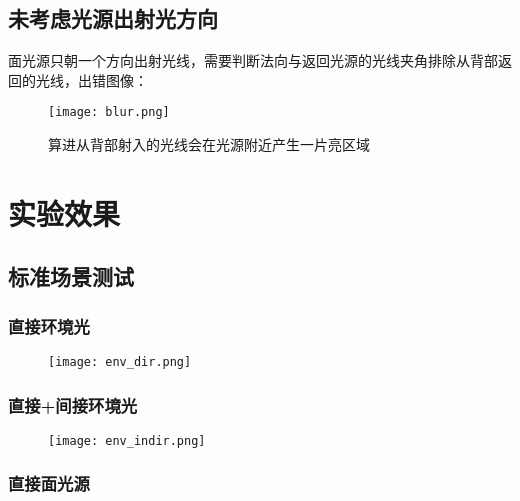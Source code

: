 \documentclass[14pt]{scrartcl} %
\begin{document}
\subsection{未考虑光源出射光方向}

面光源只朝一个方向出射光线，需要判断法向与返回光源的光线夹角排除从背部返回的光线，出错图像：

\begin{figure}[h] %
	\centering
	\texttt{[image: blur.png]} %
	\caption{算进从背部射入的光线会在光源附近产生一片亮区域}
\end{figure}

\pagebreak

\section{实验效果}

\subsection{标准场景测试}

\subsubsection{直接环境光}

\begin{figure}[h] %
	\centering
	\texttt{[image: env\_dir.png]} %
\end{figure}

\subsubsection{直接+间接环境光}

\begin{figure}[h] %
	\centering
	\texttt{[image: env\_indir.png]} %
\end{figure}

\pagebreak

\subsubsection{直接面光源}
\end{document}
